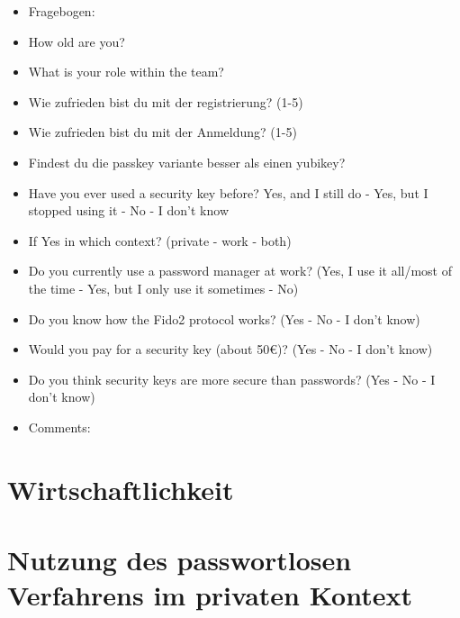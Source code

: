 \begin{itemize}
    \item Fragebogen:
    \item How old are you?
    \item What is your role within the team?
    \item Wie zufrieden bist du mit der registrierung? (1-5)
    \item Wie zufrieden bist du mit der Anmeldung? (1-5)
    \item Findest du die passkey variante besser als einen yubikey?
    \item Have you ever used a security key before? Yes, and I still do - Yes, but I stopped using it - No - I don't know
    \item If Yes in which context? (private - work - both)
    \item Do you currently use a password manager at work? (Yes, I use it all/most of the time - Yes, but I only use it sometimes - No)
    \item Do you know how the Fido2 protocol works? (Yes - No - I don't know)
    \item Would you pay for a security key (about 50€)? (Yes - No - I don't know)
    \item Do you think security keys are more secure than passwords? (Yes - No - I don't know)
    \item Comments:
\end{itemize}

\section{Wirtschaftlichkeit}

\section{Nutzung des passwortlosen Verfahrens im privaten Kontext}